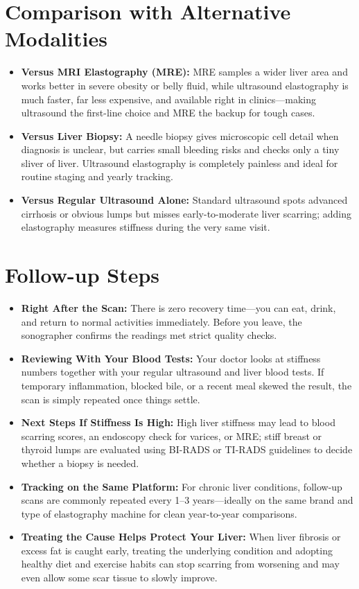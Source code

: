 \section{Comparison with Alternative Modalities}

\begin{itemize}
    \item \textbf{Versus MRI Elastography (MRE):} MRE samples a wider liver area and works better in severe obesity or belly fluid, while ultrasound elastography is much faster, far less expensive, and available right in clinics---making ultrasound the first-line choice and MRE the backup for tough cases.
    \item \textbf{Versus Liver Biopsy:} A needle biopsy gives microscopic cell detail when diagnosis is unclear, but carries small bleeding risks and checks only a tiny sliver of liver. Ultrasound elastography is completely painless and ideal for routine staging and yearly tracking.
    \item \textbf{Versus Regular Ultrasound Alone:} Standard ultrasound spots advanced cirrhosis or obvious lumps but misses early-to-moderate liver scarring; adding elastography measures stiffness during the very same visit.
\end{itemize}

\section{Follow-up Steps}

\begin{itemize}
    \item \textbf{Right After the Scan:} There is zero recovery time---you can eat, drink, and return to normal activities immediately. Before you leave, the sonographer confirms the readings met strict quality checks.
    \item \textbf{Reviewing With Your Blood Tests:} Your doctor looks at stiffness numbers together with your regular ultrasound and liver blood tests. If temporary inflammation, blocked bile, or a recent meal skewed the result, the scan is simply repeated once things settle.
    \item \textbf{Next Steps If Stiffness Is High:} High liver stiffness may lead to blood scarring scores, an endoscopy check for varices, or MRE; stiff breast or thyroid lumps are evaluated using BI-RADS or TI-RADS guidelines to decide whether a biopsy is needed.
    \item \textbf{Tracking on the Same Platform:} For chronic liver conditions, follow-up scans are commonly repeated every 1--3 years---ideally on the same brand and type of elastography machine for clean year-to-year comparisons.
    \item \textbf{Treating the Cause Helps Protect Your Liver:} When liver fibrosis or excess fat is caught early, treating the underlying condition and adopting healthy diet and exercise habits can stop scarring from worsening and may even allow some scar tissue to slowly improve.
\end{itemize}

